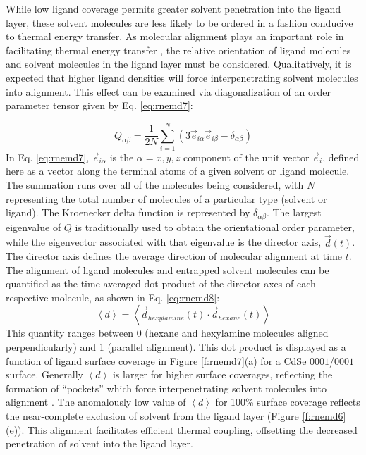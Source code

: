 While low ligand coverage permits greater solvent penetration into the ligand layer, these solvent molecules are less likely to be ordered in a fashion conducive to thermal energy transfer. As molecular alignment plays an important role in facilitating thermal energy transfer \cite{shen2010polyethylene}, the relative orientation of ligand molecules and solvent molecules in the ligand layer must be considered. Qualitatively, it is expected that higher ligand densities will force interpenetrating solvent molecules into alignment. This effect can be examined via diagonalization of an order parameter tensor given by Eq. \ref{eq:rnemd7}: \par
\begin{equation} \label{eq:rnemd7}
Q_{\alpha\beta} = \frac{1}{2N}\sum^N_{i = 1} \left(3\vec{e}_{i\alpha}\vec{e}_{i\beta} - \delta_{\alpha\beta}\right)
\end{equation}
In Eq. \ref{eq:rnemd7}, $\vec{e}_{i\alpha}$ is the $\alpha = x, y, z$ component of the unit vector $\vec{e}_i$, defined here as a vector along the terminal atoms of a given solvent or ligand molecule. The summation runs over all of the molecules being considered, with $N$ representing the total number of molecules of a particular type (solvent or ligand). The Kroenecker delta function is represented by $\delta_{\alpha\beta}$. The largest eigenvalue of $Q$ is traditionally used to obtain the orientational order parameter, while the eigenvector associated with that eigenvalue is the director axis, $\vec{d}(t)$. The director axis defines the average direction of molecular alignment at time $t$. The alignment of ligand molecules and entrapped solvent molecules can be quantified as the time-averaged dot product of the director axes of each respective molecule, as shown in Eq. \ref{eq:rnemd8}: 
\begin{equation} \label{eq:rnemd8}
\left\langle d \right\rangle = \left\langle \vec{d}_{hexylamine}(t) \cdot \vec{d}_{hexane}(t)\right\rangle
\end{equation}
This quantity ranges between 0 (hexane and hexylamine molecules aligned perpendicularly) and 1 (parallel alignment). This dot product is displayed as a function of ligand surface coverage in Figure \ref{f:rnemd7}(a) for a CdSe $0001$/$000\bar{1}$ surface. Generally $\left\langle d \right\rangle$ is larger for higher surface coverages, reflecting the formation of “pockets” which force interpenetrating solvent molecules into alignment \cite{doi:10.1021/jp312734f}. The anomalously low value of $\left\langle d \right\rangle$ for 100\% surface coverage reflects the near-complete exclusion of solvent from the ligand layer (Figure \ref{f:rnemd6}(e)). This alignment facilitates efficient thermal coupling, offsetting the decreased penetration of solvent into the ligand layer. \par

